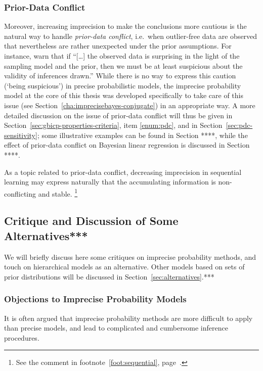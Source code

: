 \subsubsection{Prior-Data Conflict}
\label{sec:motivation:pdc}

Moreover, increasing imprecision to make the conclusions more cautious
is the natural way to handle \emph{prior-data conflict},
i.e.\ when outlier-free data are observed that nevertheless are rather unexpected under the prior assumptions.
For instance, \textcite[p.~893]{2006:evans} warn that if
``[\ldots] the observed data is surprising in the light of the sampling model and the prior,
then we must be at least suspicious about the validity of inferences drawn.''
While there is no way to express this caution (`being suspicious') in precise probabilistic models,
the imprecise probability model at the core of this thesis was developed specifically to take care of this issue
(see Section~\ref{cha:imprecisebayes-conjugate}) in an appropriate way.
A more detailed discussion on the issue of prior-data conflict will thus be given in Section~\ref{sec:gbicp-properties-criteria},
item \ref{enum:pdc}, and in Section~\ref{sec:pdc-sensitivity};
some illustrative examples can be found in Section ****,
while the effect of prior-data conflict on Bayesian linear regression is discussed in Section ****.

As a topic related to prior-data conflict, decreasing imprecision in sequential learning
may express naturally that the accumulating information is non-conflicting and stable.%
\footnote{See the comment in footnote~\ref{foot:sequential}, page~\pageref{foot:sequential}.}


\subsection{Critique and Discussion of Some Alternatives***}
\label{sec:ip-alternatives}

We will briefly discuss here some critiques on imprecise probability methods,
and touch on hierarchical models as an alternative.
Other models based on sets of prior distributions will be discussed in Section~\ref{sec:alternatives}.***

\subsubsection{Objections to Imprecise Probability Models}

It is often argued that imprecise probability methods are more difficult to apply than precise models,
and lead to complicated and cumbersome inference procedures.

